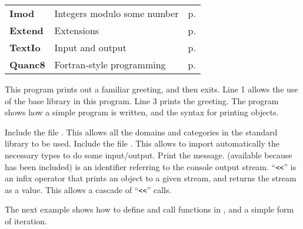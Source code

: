 \begin{tabular}{@{}llr@{}}
{\bf Imod} & Integers modulo some number
           & p. \pageref{imodnSample} \\
{\bf Extend} & Extensions
             & p. \pageref{extendSample} \\
{\bf TextIo} & Input and output
             & p. \pageref{ioSample} \\
{\bf Quanc8} & Fortran-style programming 
             & p. \pageref{quanc8Sample} \\
\end{tabular}
\newpage

This program prints out a familiar greeting, and then exits. Line 1
allows the use of the base \asharp{} library in this
program. Line 3 prints the greeting. The program shows how a simple
program is written, and the syntax for printing objects.


\begin{description}
 Include the file . This allows all the domains
and categories in the standard library to be used.
 Include the file . This allows to import
automatically the necessary types to do some input/output.
 Print the message.  (available because 
has been included) is an identifier referring
to the console output stream. ``\verb+<<+'' is an infix operator that
prints an object to a given stream, and returns the stream as a
value. This allows a cascade of ``\verb+<<+'' calls.
\end{description}

\newpage

The next example\label{factpage} shows how to define and call functions in \asharp,
and a simple form of iteration.


